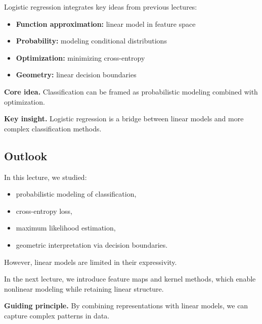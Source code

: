 Logistic regression integrates key ideas from previous lectures:

\begin{itemize}
    \item \textbf{Function approximation:} linear model in feature space
    \item \textbf{Probability:} modeling conditional distributions
    \item \textbf{Optimization:} minimizing cross-entropy
    \item \textbf{Geometry:} linear decision boundaries
\end{itemize}

\medskip

\noindent
\textbf{Core idea.}  
Classification can be framed as probabilistic modeling combined with optimization.

\medskip

\noindent
\textbf{Key insight.}  
Logistic regression is a bridge between linear models and more complex classification methods.

\subsection{Outlook}

In this lecture, we studied:

\begin{itemize}
    \item probabilistic modeling of classification,
    \item cross-entropy loss,
    \item maximum likelihood estimation,
    \item geometric interpretation via decision boundaries.
\end{itemize}

\medskip

\noindent
However, linear models are limited in their expressivity.

\medskip

\noindent
In the next lecture, we introduce feature maps and kernel methods, which enable nonlinear modeling while retaining linear structure.

\medskip

\noindent
\textbf{Guiding principle.}  
By combining representations with linear models, we can capture complex patterns in data.